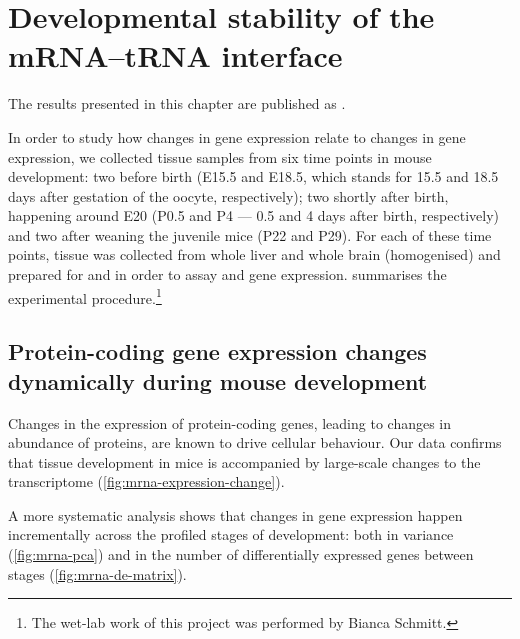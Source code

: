 \chapter{Developmental stability of the mRNA–tRNA interface}

The results presented in this chapter are published as \citet{Schmitt:2014}.



In order to study how changes in \mrna gene expression relate to changes in
\trna gene expression, we collected tissue samples from six time points in mouse
development: two before birth (E15.5 and E18.5, which stands for \num{15.5} and
\num{18.5} days after gestation of the oocyte, respectively); two shortly after
birth, happening around E20 (P0.5 and P4 --- \num{0.5} and \num{4} days after
birth, respectively) and two after weaning the juvenile mice (P22 and P29). For
each of these time points, tissue was collected from whole liver and whole brain
(homogenised) and prepared for \rnaseq and  \chipseq in order to assay
\mrna and \trna gene expression.  summarises the
experimental procedure.\footnote{The wet-lab work of this project was performed
by Bianca Schmitt.}



\section{Protein-coding gene expression changes dynamically during mouse
development}

Changes in the expression of protein-coding genes, leading to changes in
abundance of proteins, are known to drive cellular behaviour. Our data
confirms that tissue development in mice is accompanied by large-scale changes
to the \mrna transcriptome (\cref{fig:mrna-expression-change}).

A more systematic analysis shows that changes in gene expression happen
incrementally across the profiled stages of development: both in variance
(\cref{fig:mrna-pca}) and in the number of differentially expressed genes
between stages (\cref{fig:mrna-de-matrix}).

